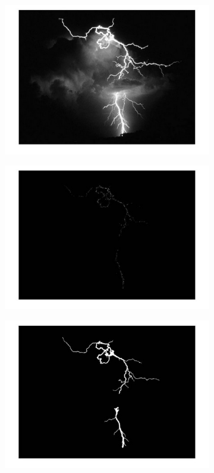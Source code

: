 \begin{figure}[H]
	\captionsetup{justification=centering}
	\begin{center}
		\begin{subfigure}[t]{2.5in}
			\centering
			\includegraphics[width=.9\textwidth]{./imagenes/regionGrowing6}
			\label{regionGrowing6}
		\end{subfigure}
	\end{center}	
	\begin{subfigure}[t]{2.5in}
		\centering
		\includegraphics[width=.9\textwidth]{./imagenes/regionGrowing2}
		\label{regionGrowing2}
	\end{subfigure}
	\begin{subfigure}[t]{2.5in}
		\centering
		\includegraphics[width=.9\textwidth]{./imagenes/regionGrowing3}

\end{subfigure}
\end{figure}
